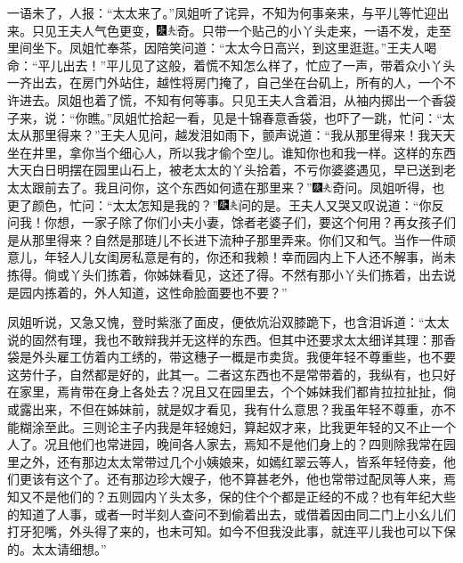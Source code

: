 一语未了，人报：``太太来了。''凤姐听了诧异，不知为何事亲来，与平儿等忙迎出来。只见王夫人气色更变，{\includegraphics[width=3mm]{../Images/00004}\includegraphics[width=3mm]{../Images/00012}\footnotesize \kaishu 奇。}只带一个贴己的小丫头走来，一语不发，走至里间坐下。凤姐忙奉茶，因陪笑问道：``太太今日高兴，到这里逛逛。''王夫人喝命：``平儿出去！''平儿见了这般，着慌不知怎么样了，忙应了一声，带着众小丫头一齐出去，在房门外站住，越性将房门掩了，自己坐在台矶上，所有的人，一个不许进去。凤姐也着了慌，不知有何等事。只见王夫人含着泪，从袖内掷出一个香袋子来，说：``你瞧。''凤姐忙拾起一看，见是十锦春意香袋，也吓了一跳，忙问：``太太从那里得来？''王夫人见问，越发泪如雨下，颤声说道：``我从那里得来！我天天坐在井里，拿你当个细心人，所以我才偷个空儿。谁知你也和我一样。这样的东西大天白日明摆在园里山石上，被老太太的丫头拾着，不亏你婆婆遇见，早已送到老太太跟前去了。我且问你，这个东西如何遗在那里来？''{\includegraphics[width=3mm]{../Images/00004}\includegraphics[width=3mm]{../Images/00012}\footnotesize \kaishu 奇问。}凤姐听得，也更了颜色，忙问：``太太怎知是我的？''{\includegraphics[width=3mm]{../Images/00004}\includegraphics[width=3mm]{../Images/00012}\footnotesize \kaishu 问的是。}王夫人又哭又叹说道：``你反问我！你想，一家子除了你们小夫小妻，馀者老婆子们，要这个何用？再女孩子们是从那里得来？自然是那琏儿不长进下流种子那里弄来。你们又和气。当作一件顽意儿，年轻人儿女闺房私意是有的，你还和我赖！幸而园内上下人还不解事，尚未拣得。倘或丫头们拣着，你姊妹看见，这还了得。不然有那小丫头们拣着，出去说是园内拣着的，外人知道，这性命脸面要也不要？''

凤姐听说，又急又愧，登时紫涨了面皮，便依炕沿双膝跪下，也含泪诉道：``太太说的固然有理，我也不敢辩我并无这样的东西。但其中还要求太太细详其理：那香袋是外头雇工仿着内工绣的，带这穗子一概是市卖货。我便年轻不尊重些，也不要这劳什子，自然都是好的，此其一。二者这东西也不是常带着的，我纵有，也只好在家里，焉肯带在身上各处去？况且又在园里去，个个姊妹我们都肯拉拉扯扯，倘或露出来，不但在姊妹前，就是奴才看见，我有什么意思？我虽年轻不尊重，亦不能糊涂至此。三则论主子内我是年轻媳妇，算起奴才来，比我更年轻的又不止一个人了。况且他们也常进园，晚间各人家去，焉知不是他们身上的？四则除我常在园里之外，还有那边太太常带过几个小姨娘来，如嫣红翠云等人，皆系年轻侍妾，他们更该有这个了。还有那边珍大嫂子，他不算甚老外，他也常带过配凤等人来，焉知又不是他们的？五则园内丫头太多，保的住个个都是正经的不成？也有年纪大些的知道了人事，或者一时半刻人查问不到偷着出去，或借着因由同二门上小幺儿们打牙犯嘴，外头得了来的，也未可知。如今不但我没此事，就连平儿我也可以下保的。太太请细想。''

